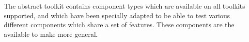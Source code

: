 
The abstract toolkit contains component types which are available on all toolkits supported, and which have been specially adapted to be able to test various different components which share a set of features. These components are the  available to make \gdsteps{} more general. 
